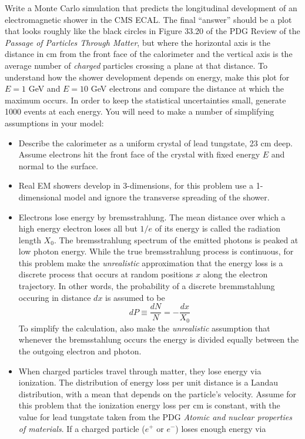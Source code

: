 Write a Monte Carlo simulation that
predicts the longitudinal development of an electromagnetic shower in
the CMS ECAL.  The final ``answer'' should be a plot that looks 
roughly like the black circles in Figure 33.20 of the PDG Review of 
the {\it Passage of Particles
Through Matter}, but where the horizontal axis is the distance in cm
from the front face of the calorimeter and the vertical axis is
the average number of {\it charged} particles crossing a plane at 
that distance.  
To understand how the shower development depends on energy, make
this plot for $E=1$ GeV and $E=10$ GeV electrons and compare
the distance at which the maximum occurs. 
In order to keep the statistical
uncertainties small, generate 1000 events at each energy.
\newpage
You will need to make a 
number of simplifying assumptions in your model: 
\begin{itemize}
\item Describe the calorimeter as a uniform  crystal of lead tungstate, 23
cm deep.  Assume electrons hit the front face of the crystal with 
fixed energy
$E$ and normal to the surface.
\item Real EM showers develop in 3-dimensions, for this problem use a 1-dimensional
model and ignore the transverse spreading of the shower.
\item Electrons lose energy by bremsstrahlung.  The mean distance
over which a high energy electron loses all but $1/e$ of its energy is
called the radiation length $X_0$.
The bremsstrahlung spectrum of
the emitted photons is peaked at low photon energy. 
While the true bremsstrahlung process is continuous, for this problem
make the {\it unrealistic} approximation that the energy loss is a discrete process
that occurs at random positions $x$ along the electron trajectory.
In other words, the probability of a discrete bremmstahlung occuring in distance $dx$ is
assumed to be 
$$
dP \equiv \frac{dN}{N} = - \frac{dx}{X_0}
$$
To simplify the calculation, also make the {\it unrealistic} assumption
that whenever the bremsstahlung occurs the energy is divided equally
between the the outgoing electron and photon.
\item When charged particles travel through matter, they lose energy 
via ionization.
The distribution of energy loss per unit distance is a Landau distribution,
with a mean that depends on the particle's velocity.
Assume for this problem
that the ionization energy loss per cm is constant, with
the value for lead tungstate
taken from the PDG {\it Atomic and nuclear properties of materials}.
If a charged particle ($e^+$ or $e^-$) loses enough energy via 

\end{itemize}
